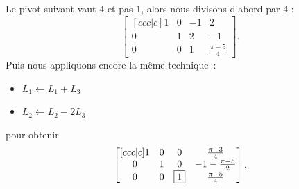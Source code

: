 \begin{frame}
Le pivot suivant vaut \(4\) et pas \(1\), alors nous divisons d'abord par \(4\) :\pause{}
\begin{equation*}
  \begin{bmatrix}[ccc|c]
    1 & 0        & -1 & 2  \\
    0 & {1} & 2  & -1 \\
    0 & 0 & 1 & \frac{\pi -5}{4}
  \end{bmatrix}.
\end{equation*}\pause{}
Puis nous appliquons encore la même technique~:
\begin{itemize}\pause{}
\item \(L_{1} \leftarrow L_{1} + L_{3}\)\pause{}
\item \(L_{2} \leftarrow L_{2} - 2 L_{3}\)\pause{}
\end{itemize}
pour obtenir\pause
\begin{equation*}
  \begin{bmatrix}[ccc|c]
    1 & 0        & 0 & \frac{\pi + 3}{4}  \\
    0 & 1 & 0  & -1 - \frac{\pi - 5}{2} \\
    0 & 0 & \fbox{1} & \frac{\pi -5}{4}
  \end{bmatrix}.
\end{equation*}
\end{frame}

